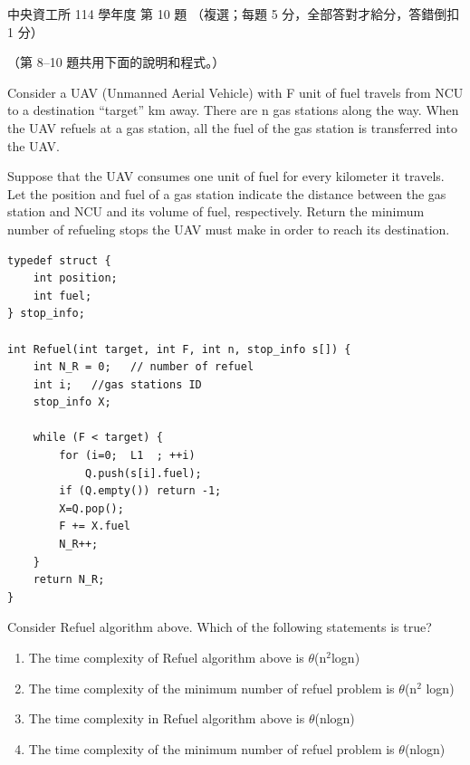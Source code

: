 \begin{pastexam}[label={px:ncu-114-dsa-10}]{中央資工所 114 學年度 第 10 題}
（複選；每題 5 分，全部答對才給分，答錯倒扣 1 分）

（第 8--10 題共用下面的說明和程式。）

Consider a UAV (Unmanned Aerial Vehicle) with F unit of fuel travels from NCU to a destination
``target'' km away. There are n gas stations along the way. When the UAV refuels at a gas station, all
the fuel of the gas station is transferred into the UAV.

Suppose that the UAV consumes one unit of fuel for every kilometer it travels. Let the position and fuel
of a gas station indicate the distance between the gas station and NCU and its volume of fuel,
respectively. Return the minimum number of refueling stops the UAV must make in order to reach its
destination.
\begin{verbatim}
typedef struct {
    int position;
    int fuel;
} stop_info;

int Refuel(int target, int F, int n, stop_info s[]) {
    int N_R = 0;   // number of refuel
    int i;   //gas stations ID
    stop_info X;

    while (F < target) {
        for (i=0;  L1  ; ++i)
            Q.push(s[i].fuel);
        if (Q.empty()) return -1;
        X=Q.pop();
        F += X.fuel
        N_R++;
    }
    return N_R;
}
\end{verbatim}

Consider Refuel algorithm above. Which of the following statements is true?
\begin{enumerate}[label=(\alph*)]
\item The time complexity of Refuel algorithm above is $\theta$(n$^2$logn)
\item The time complexity of the minimum number of refuel problem is $\theta$(n$^2$ logn)
\item The time complexity in Refuel algorithm above is $\theta$(nlogn)
\item The time complexity of the minimum number of refuel problem is $\theta$(nlogn)
\end{enumerate}
\end{pastexam}

